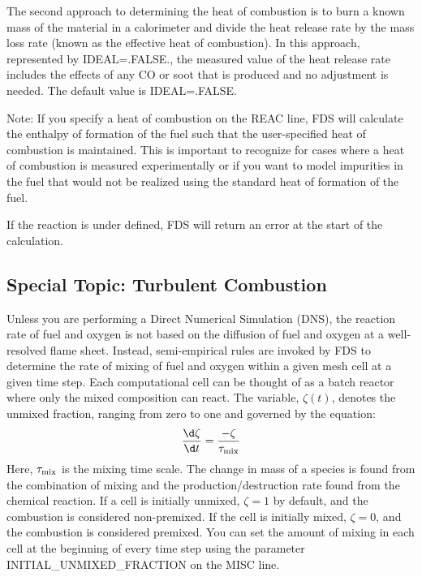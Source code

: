 \documentclass[11pt]{book}
\begin{document}
The second approach to determining the heat of combustion is to burn a known mass of the material in a calorimeter and divide the heat release
rate by the mass loss rate (known as the effective heat of combustion).  In this approach, represented by {\ct IDEAL=.FALSE.},
the measured value of the heat release rate includes the effects of any CO or soot that is produced and no adjustment is needed.  The default value is {\ct IDEAL=.FALSE.}

Note: If you specify a heat of combustion on the {\ct REAC} line, FDS will calculate the enthalpy of formation of the fuel such that the user-specified heat of combustion is maintained. This is important to recognize for cases where a heat of combustion is measured experimentally or if you want to model impurities in the fuel that would not be realized using the standard heat of formation of the fuel.

If the reaction is under defined, FDS will return an error at the start of the calculation.


\subsection{Special Topic: Turbulent Combustion}

\label{info:turbulent_combustion}

Unless you are performing a Direct Numerical Simulation (DNS), the reaction rate of fuel and oxygen is not based on the diffusion of
fuel and oxygen at a well-resolved flame sheet. Instead, semi-empirical rules are invoked by FDS to determine the rate of mixing of fuel and oxygen within
a given mesh cell at a given time step. Each computational cell can be thought of as a batch reactor where only the mixed composition can react. The variable, $\zeta(t)$, denotes the unmixed fraction, ranging from zero to one and governed by the equation:
\begin{equation}
\frac{\d \zeta}{\d t}=\frac{-\zeta}{\tau_{\rm mix}}
\label{eq:edc_mix}
\end{equation}
Here, $\tau_{\rm mix}$ is the mixing time scale. The change in mass of a species is found from the combination of mixing and the production/destruction rate found from the chemical reaction. If a cell is initially unmixed, $\zeta=1$ by default, and the combustion is considered non-premixed. If the cell is initially mixed, $\zeta=0$, and the combustion is considered premixed. You can set the amount of mixing in each cell at the beginning of every time step using the parameter {\ct INITIAL\_UNMIXED\_FRACTION} on the {\ct MISC} line.
\end{document}
